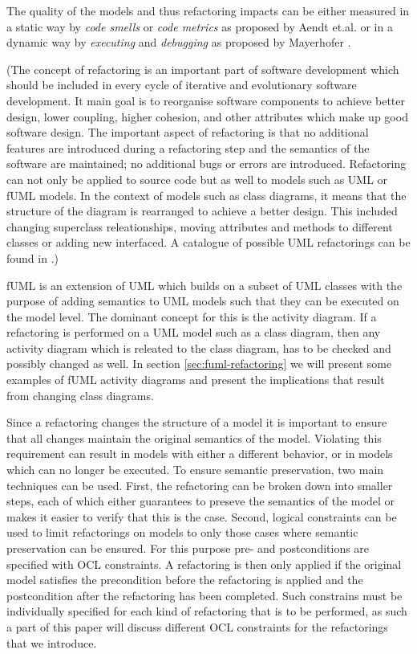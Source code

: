 \documentclass{llncs}
\begin{document}
The quality of the models and thus refactoring impacts can be either measured in a static way by \textit{code smells} or \textit{code metrics} 
as proposed by Aendt et.al. \cite{DBLP:journals/ase/ArendtT13} or in a dynamic way by \textit{executing} and \textit{debugging} as proposed by 
Mayerhofer \cite{DBLP:conf/icse/Mayerhofer12}.


(The concept of refactoring is an important part of software development which should be included in every cycle of iterative and evolutionary
software development. It main goal is to reorganise software components to achieve better design, lower coupling, higher cohesion, and other
attributes which make up good software design. The important aspect of refactoring is that no additional features are introduced during
a refactoring step and the semantics of the software are maintained; no additional bugs or errors are introduced. Refactoring can not only
be applied to source code but as well to models such as UML or fUML models. In the context of models such as class diagrams, it means that
the structure of the diagram is rearranged to achieve a better design. This included changing superclass releationships, moving attributes
and methods to different classes or adding new interfaced. A catalogue of possible UML refactorings can be found in .)

fUML is an extension of UML which builds on a subset of UML classes with the purpose of adding semantics to UML models such that they can
be executed on the model level. The dominant concept for this is the activity diagram. If a refactoring is performed on a UML model such
as a class diagram, then any activity diagram which is releated to the class diagram, has to be checked and possibly changed as well. In
section \ref{sec:fuml-refactoring} we will present some examples of fUML activity diagrams and present the implications that result from
changing class diagrams.

Since a refactoring changes the structure of a model it is important to ensure that all changes maintain the original semantics of the
model. Violating this requirement can result in models with either a different behavior, or in models which can no longer be executed.
To ensure semantic preservation, two main techniques can be used. First, the refactoring can be broken down into smaller steps, each of
which either guarantees to preseve the semantics of the model or makes it easier to verify that this is the case. Second, logical
constraints can be used to limit refactorings on models to only those cases where semantic preservation can be ensured. For this
purpose pre- and postconditions are specified with OCL constraints. A refactoring is then only applied if the original model satisfies
the precondition before the refactoring is applied and the postcondition after the refactoring has been completed. Such constrains must
be individually specified for each kind of refactoring that is to be performed, as such a part of this paper will discuss different OCL
constraints for the refactorings that we introduce.
\end{document}
